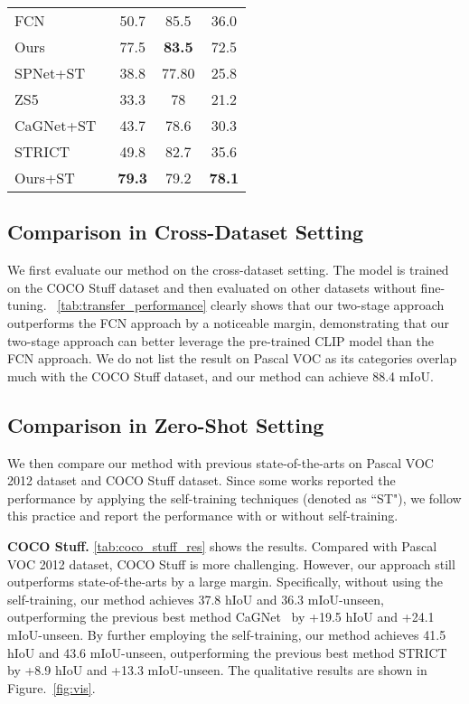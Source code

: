\documentclass[runningheads]{llncs}
\begin{document}
\begin{figtab}
\begin{minipage}[b]{0.48\linewidth}
\begin{tabular}{l|c|c|c}
    FCN&50.7 & 85.5&36.0 \\
    Ours&77.5     & \textbf{83.5} & 72.5                \\
    \hline
    SPNet+ST~\cite{xian2019semantic}&38.8          & 77.80                                            & 25.8                 \\
    ZS5~\cite{bucher2019zero}&33.3              &            78                                    & 21.2                 \\
    CaGNet+ST~\cite{gu2020context}&43.7 & 78.6                                      & 30.3                 \\
    STRICT~\cite{pastore2021closer}&49.8  & 82.7                             & 35.6                 \\
    Ours+ST&\textbf{79.3}  & 79.2 & \textbf{78.1}                \\
    \bottomrule
    \end{tabular}
    \label{tab:pascal_voc_res}
  \end{minipage}
  \vspace{-1em}
\end{figtab}

\subsection{Comparison in Cross-Dataset Setting}
We first evaluate our method on the cross-dataset setting. The model is trained on the COCO Stuff dataset and then evaluated on other datasets without fine-tuning. ~\cref{tab:transfer_performance} clearly shows that our two-stage approach outperforms the FCN approach by a noticeable margin, demonstrating that our two-stage approach can better leverage the pre-trained CLIP model than the FCN approach. We do not list the result on Pascal VOC as its categories overlap much with the COCO Stuff dataset, and our method can achieve 88.4 mIoU.


\subsection{Comparison in Zero-Shot Setting}
We then compare our method with previous state-of-the-arts on Pascal VOC 2012 dataset and COCO Stuff dataset. Since some works reported the performance by applying the self-training techniques (denoted as ``ST"), we follow this practice and report the performance with or without self-training. 


\noindent\textbf{COCO Stuff.} 
\cref{tab:coco_stuff_res} shows the results. Compared with Pascal VOC 2012 dataset, COCO Stuff is more challenging. However, our approach still outperforms state-of-the-arts by a large margin. Specifically, without using the self-training, our method achieves 37.8 hIoU and 36.3 mIoU-unseen, outperforming the previous best method CaGNet~\cite{gu2020context} by +19.5 hIoU and +24.1 mIoU-unseen. By further employing the self-training, our method achieves 41.5 hIoU and 43.6 mIoU-unseen, outperforming the previous best method STRICT~\cite{pastore2021closer} by +8.9 hIoU and +13.3 mIoU-unseen. The qualitative results are shown in Figure.~\ref{fig:vis}. 
\end{document}
